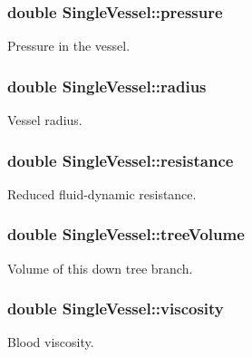 \subsubsection[{\texorpdfstring{pressure}{pressure}}]{\setlength{\rightskip}{0pt plus 5cm}double Single\+Vessel\+::pressure}\hypertarget{class_single_vessel_af3e07bf47e7fbc3f04bfa9c7aaa51926}{}\label{class_single_vessel_af3e07bf47e7fbc3f04bfa9c7aaa51926}
Pressure in the vessel. 
\subsubsection[{\texorpdfstring{radius}{radius}}]{\setlength{\rightskip}{0pt plus 5cm}double Single\+Vessel\+::radius}\hypertarget{class_single_vessel_a972becbedffb100e3839f5fb06d54ee3}{}\label{class_single_vessel_a972becbedffb100e3839f5fb06d54ee3}
Vessel radius. 
\subsubsection[{\texorpdfstring{resistance}{resistance}}]{\setlength{\rightskip}{0pt plus 5cm}double Single\+Vessel\+::resistance}\hypertarget{class_single_vessel_ac629f35d34a3adb31f92b06823b320b2}{}\label{class_single_vessel_ac629f35d34a3adb31f92b06823b320b2}
Reduced fluid-\/dynamic resistance. 
\subsubsection[{\texorpdfstring{tree\+Volume}{treeVolume}}]{\setlength{\rightskip}{0pt plus 5cm}double Single\+Vessel\+::tree\+Volume}\hypertarget{class_single_vessel_a2d9634eeadb4fce742f5bfdf4f9077ed}{}\label{class_single_vessel_a2d9634eeadb4fce742f5bfdf4f9077ed}
Volume of this down tree branch. 
\subsubsection[{\texorpdfstring{viscosity}{viscosity}}]{\setlength{\rightskip}{0pt plus 5cm}double Single\+Vessel\+::viscosity}\hypertarget{class_single_vessel_ab11b1dc88a1725b79d6ef2344680cf77}{}\label{class_single_vessel_ab11b1dc88a1725b79d6ef2344680cf77}
Blood viscosity. 
